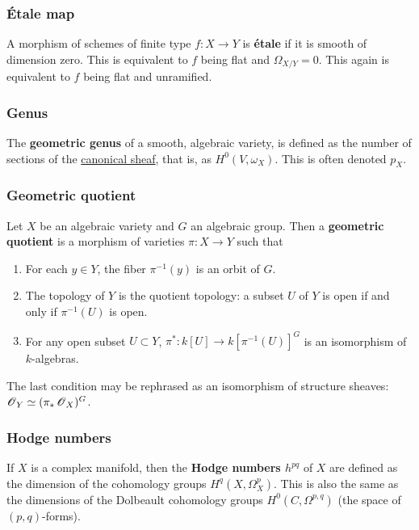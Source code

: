 \documentclass[11pt, english]{article}
\begin{document}
\subsubsection{Étale map}
\label{etalemap}

A morphism of schemes of finite type $f:X \to Y$ is \textbf{étale} if it is smooth of dimension zero. This is equivalent to $f$ being flat and $\Omega_{X/Y}=0$. This again is equivalent to $f$ being flat and unramified.

\subsubsection{Genus}
\label{genus}
 
The \textbf{geometric genus} of a smooth, algebraic variety, is defined as the number of sections of the \hyperref[canonicalsheaf]{canonical sheaf}, that is, as $H^0(V,\omega_X)$. This is often denoted $p_X$.

\subsubsection{Geometric quotient}
\label{geometricquotient}

Let $X$ be an algebraic variety and $G$ an algebraic group. Then a \textbf{geometric quotient} is a morphism of varieties $\pi:X \to Y$ such that
\begin{enumerate}
\item For each $y \in Y$, the fiber $\pi^{-1}(y)$ is an orbit of $G$.
\item The topology of $Y$ is the quotient topology: a subset $U$ of $Y$ is open if and only if $\pi^{-1}(U)$ is open.
\item For any open subset $U \subset Y$, $\pi^\ast: k[U] \to k[\pi^{-1}(U)]^G$ is an isomorphism of $k$-algebras.
\end{enumerate}
The last condition may be rephrased as an isomorphism of structure sheaves: $\operatorname{\mathscr{O}}_Y \simeq (\pi_\ast \operatorname{\mathscr{O}}_X)^G$.   

\subsubsection{Hodge numbers}
\label{hodgenumbers}

If $X$ is a complex manifold, then the \textbf{Hodge numbers $h^{pq}$} of $X$ are defined as the dimension of the cohomology groups $H^q(X,\Omega_X^p)$. This is also the same as the dimensions of the Dolbeault cohomology groups $H^0(C,\Omega^{p,q})$ (the space of $(p,q)$-forms).
\end{document}
